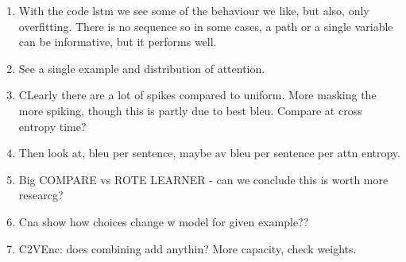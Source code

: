 \begin{enumerate}
    \item With the code lstm we see some of the behaviour we like, but also, only overfitting. There is no sequence so in some cases, a path or a single variable can be informative, but it performs well.
    \item See a single example and distribution of attention.
    \item CLearly there are a lot of spikes compared to uniform. More masking the more spiking, though this is partly due to best bleu. Compare at cross entropy time?
    \item Then look at, bleu per sentence, maybe av bleu per sentence per attn entropy.
    \item Big COMPARE vs ROTE LEARNER - can we conclude this is worth more researcg?
    \item Cna show how choices change w model for given example??

    \item C2VEnc: does combining add anythin? More capacity, check weights.
\end{enumerate}



